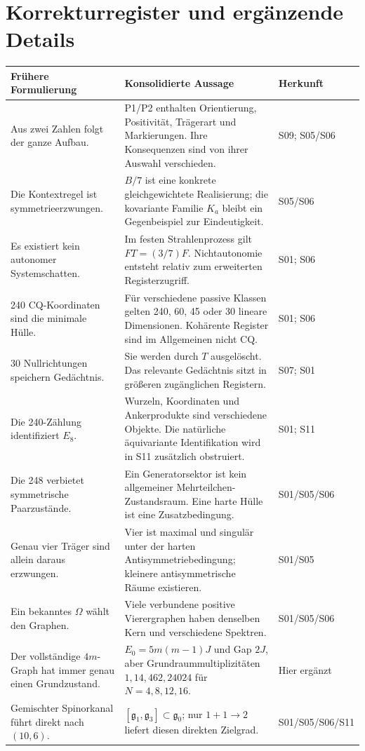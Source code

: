 \chapter{Korrekturregister und ergänzende Details}
\label{app:corrections}
\begin{longtable}{L{46mm}L{77mm}L{27mm}}
\toprule \textbf{Frühere Formulierung}&\textbf{Konsolidierte Aussage}&\textbf{Herkunft}\\\midrule\endhead
Aus zwei Zahlen folgt der ganze Aufbau.&P1/P2 enthalten Orientierung, Positivität, Trägerart und Markierungen. Ihre Konsequenzen sind von ihrer Auswahl verschieden.&S09; S05/S06\\
Die Kontextregel ist symmetrieerzwungen.&$B/7$ ist eine konkrete gleichgewichtete Realisierung; die kovariante Familie $K_a$ bleibt ein Gegenbeispiel zur Eindeutigkeit.&S05/S06\\
Es existiert kein autonomer Systemschatten.&Im festen Strahlenprozess gilt $FT=(3/7)F$. Nichtautonomie entsteht relativ zum erweiterten Registerzugriff.&S01; S06\\
240 CQ-Koordinaten sind die minimale Hülle.&Für verschiedene passive Klassen gelten 240, 60, 45 oder 30 lineare Dimensionen. Kohärente Register sind im Allgemeinen nicht CQ.&S01; S06\\
30 Nullrichtungen speichern Gedächtnis.&Sie werden durch $T$ ausgelöscht. Das relevante Gedächtnis sitzt in größeren zugänglichen Registern.&S07; S01\\
Die 240-Zählung identifiziert $E_8$.&Wurzeln, Koordinaten und Ankerprodukte sind verschiedene Objekte. Die natürliche äquivariante Identifikation wird in S11 zusätzlich obstruiert.&S01; S11\\
Die 248 verbietet symmetrische Paarzustände.&Ein Generatorsektor ist kein allgemeiner Mehrteilchen-Zustandsraum. Eine harte Hülle ist eine Zusatzbedingung.&S01/S05/S06\\
Genau vier Träger sind allein daraus erzwungen.&Vier ist maximal und singulär unter der harten Antisymmetriebedingung; kleinere antisymmetrische Räume existieren.&S01/S05\\
Ein bekanntes $\Omega$ wählt den Graphen.&Viele verbundene positive Vierergraphen haben denselben Kern und verschiedene Spektren.&S01/S05/S06\\
Der vollständige $4m$-Graph hat immer genau einen Grundzustand.&$E_0=5m(m-1)J$ und Gap $2J$, aber Grundraummultiplizitäten $1,14,462,24024$ für $N=4,8,12,16$.&Hier ergänzt\\
Gemischter Spinorkanal führt direkt nach $(10,6)$.&$[\mathfrak g_1,\mathfrak g_3]\subset\mathfrak g_0$; nur $1+1\to2$ liefert diesen direkten Zielgrad.&S01/S05/\allowbreak S06/S11\\

\end{longtable}
